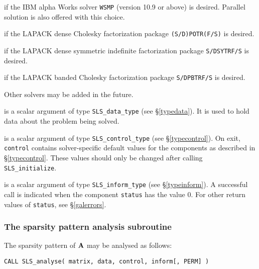 \documentclass{galahad}
\newcommand{\packagename}{SLS}
\begin{document}
\begin{description}
\begin{description}
 if the IBM alpha Works solver {\tt WSMP} (version 10.9
or above) is desired. Parallel solution is also offered with this choice.

 if the LAPACK dense Cholesky factorization package
{\tt (S/D)POTR(F/S)} is desired.

 if the LAPACK dense symmetric indefinite factorization package
{\tt S/DSYTRF/S} is desired.

 if the LAPACK banded Cholesky factorization package
{\tt S/DPBTRF/S} is desired.

\end{description}
Other solvers may be added in the future.

 is a scalar \intentout argument of type
{\tt \packagename\_data\_type}
(see \S\ref{typedata}). It is used to hold data about the problem being
solved.

 is a scalar \intentout argument of type
{\tt \packagename\_control\_type}
(see \S\ref{typecontrol}).
On exit, {\tt control} contains solver-specific default values for the
components as described in \S\ref{typecontrol}.
These values should only be changed after calling
{\tt \packagename\_initialize}.

 is a scalar \intentout argument of type
{\tt \packagename\_inform\_type}
(see \S\ref{typeinform}).
A successful call is indicated when the  component {\tt status} has the value 0.
For other return values of {\tt status}, see \S\ref{galerrors}.

\end{description}


\subsubsection{The sparsity pattern analysis subroutine}
The sparsity pattern of ${\mathbf{A}}$ may be analysed as follows:

\hskip0.5in
{\tt CALL \packagename\_analyse( matrix, data, control, inform[, PERM] )}
\end{document}

